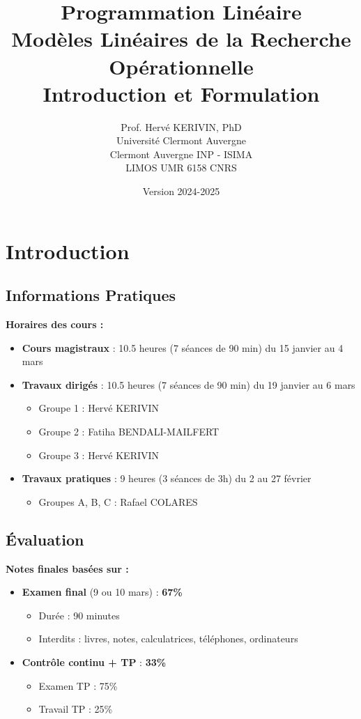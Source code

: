 \documentclass[12pt,a4paper]{article}
\title{\textbf{\Huge\color{titrebleu}Programmation Linéaire}\\[0.5em]
\large\color{defvert}Modèles Linéaires de la Recherche Opérationnelle\\
\small Introduction et Formulation}
\author{\large Prof. Hervé KERIVIN, PhD\\
\small Université Clermont Auvergne\\
Clermont Auvergne INP - ISIMA\\
LIMOS UMR 6158 CNRS}
\date{\large Version 2024-2025}
\begin{document}
\maketitle
\tableofcontents
\newpage

\section{Introduction}

\subsection{Informations Pratiques}

\begin{astuce}
\textbf{Horaires des cours :}
\begin{itemize}
    \item \textbf{Cours magistraux} : 10.5 heures (7 séances de 90 min) du 15 janvier au 4 mars
    \item \textbf{Travaux dirigés} : 10.5 heures (7 séances de 90 min) du 19 janvier au 6 mars
    \begin{itemize}
        \item Groupe 1 : Hervé KERIVIN
        \item Groupe 2 : Fatiha BENDALI-MAILFERT
        \item Groupe 3 : Hervé KERIVIN
    \end{itemize}
    \item \textbf{Travaux pratiques} : 9 heures (3 séances de 3h) du 2 au 27 février
    \begin{itemize}
        \item Groupes A, B, C : Rafael COLARES
    \end{itemize}
\end{itemize}
\end{astuce}

\subsection{Évaluation}

\begin{important}
\textbf{Notes finales basées sur :}
\begin{itemize}
    \item \textbf{Examen final} (9 ou 10 mars) : \textcolor{importantrouge}{\textbf{67\%}}
    \begin{itemize}
        \item Durée : 90 minutes
        \item Interdits : livres, notes, calculatrices, téléphones, ordinateurs
    \end{itemize}
    \item \textbf{Contrôle continu + TP} : \textcolor{defvert}{\textbf{33\%}}
    \begin{itemize}
        \item Examen TP : 75\%
        \item Travail TP : 25\%
    \end{itemize}
\end{itemize}
\end{important}
\end{document}
